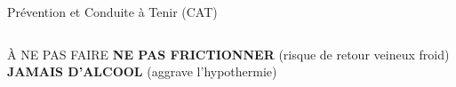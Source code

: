 \begin{frame}{Prévention et Conduite à Tenir (CAT)}
\begin{columns}[t]
    \end{columns}

    \vspace{0.4cm}

    \begin{alertblock}{À NE PAS FAIRE}
        \centering
        \textbf{NE PAS FRICTIONNER} (risque de retour veineux froid) \\
        \textbf{JAMAIS D'ALCOOL} (aggrave l'hypothermie)
    \end{alertblock}
\end{frame}
